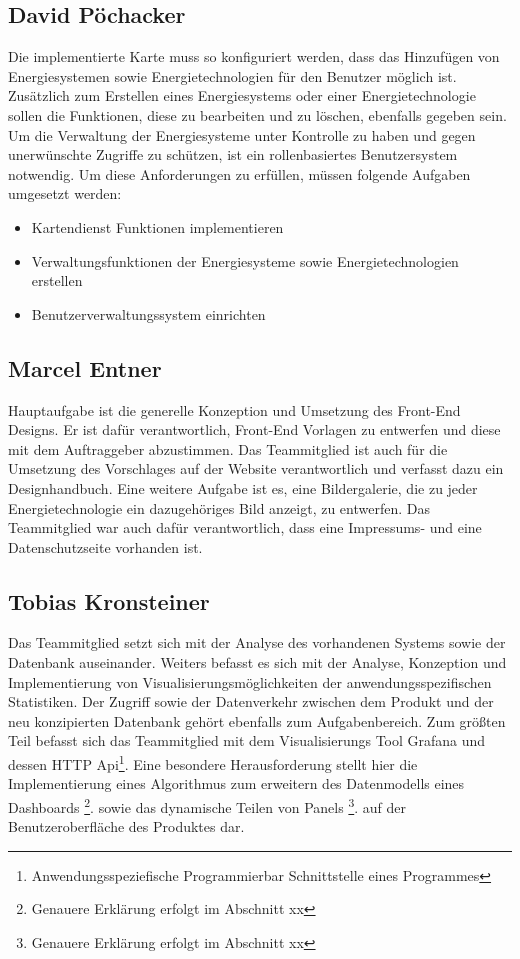 \subsection{David Pöchacker}
Die implementierte Karte muss so konfiguriert werden, dass das Hinzufügen von Energiesystemen sowie Energietechnologien für den Benutzer möglich ist. Zusätzlich zum Erstellen eines Energiesystems oder einer Energietechnologie sollen die Funktionen, diese zu bearbeiten und zu löschen, ebenfalls gegeben sein. Um die Verwaltung der Energiesysteme unter Kontrolle zu haben und gegen unerwünschte Zugriffe zu schützen, ist ein rollenbasiertes Benutzersystem notwendig. Um diese Anforderungen zu erfüllen, müssen folgende Aufgaben umgesetzt werden:
\begin{itemize}
	\item Kartendienst Funktionen implementieren
	\item Verwaltungsfunktionen der Energiesysteme sowie Energietechnologien erstellen
	\item Benutzerverwaltungssystem einrichten
\end{itemize}



\subsection{Marcel Entner}
Hauptaufgabe ist die generelle Konzeption und Umsetzung des Front-End Designs. Er ist dafür verantwortlich, Front-End Vorlagen zu entwerfen und diese mit dem Auftraggeber abzustimmen. Das Teammitglied ist auch für die Umsetzung des Vorschlages auf der Website verantwortlich und verfasst dazu ein Designhandbuch. Eine weitere Aufgabe ist es, eine Bildergalerie, die zu jeder Energietechnologie ein dazugehöriges Bild anzeigt, zu entwerfen. Das Teammitglied  war auch dafür verantwortlich, dass eine Impressums- und eine Datenschutzseite vorhanden ist. 

\subsection{Tobias Kronsteiner}
Das Teammitglied setzt sich mit der Analyse des vorhandenen Systems sowie der Datenbank auseinander. Weiters befasst es sich mit der Analyse, Konzeption und Implementierung von Visualisierungsmöglichkeiten der anwendungsspezifischen Statistiken. Der Zugriff sowie der Datenverkehr zwischen dem Produkt und der neu konzipierten Datenbank gehört ebenfalls zum Aufgabenbereich. Zum größten Teil befasst sich das Teammitglied mit dem Visualisierungs Tool Grafana und dessen HTTP Api\footnote{Anwendungsspeziefische Programmierbar Schnittstelle eines Programmes }. 
Eine besondere Herausforderung stellt hier die Implementierung eines Algorithmus zum erweitern des Datenmodells eines Dashboards \footnote{ Genauere Erklärung erfolgt im Abschnitt xx }. sowie das dynamische Teilen von Panels \footnote{ Genauere Erklärung erfolgt im Abschnitt xx }. auf der Benutzeroberfläche des Produktes dar. 





